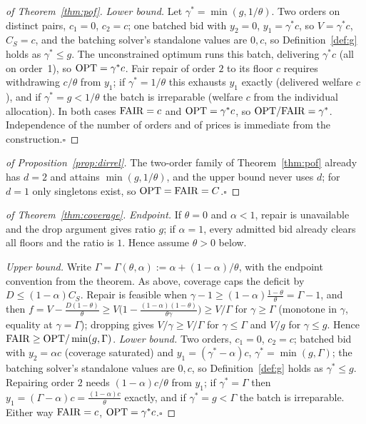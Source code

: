 \begin{proof}[of Theorem~\ref{thm:pof}]
\emph{Lower bound.} Let $\gamma^\ast=\min(g,1/\theta)$. Two orders on
distinct pairs, $c_1=0$, $c_2=c$; one batched bid with
$y_2=0$, $y_1=\gamma^\ast c$, so $V=\gamma^\ast c$, $C_S=c$, and the
batching solver's standalone values are $0,c$, so
Definition~\ref{def:g} holds as $\gamma^\ast\le g$. The unconstrained
optimum runs this batch, delivering $\gamma^\ast c$ (all on order~1), so
$\mathrm{OPT}=\gamma^\ast c$. Fair repair of order $2$ to its floor $c$ requires
withdrawing $c/\theta$ from $y_1$; if $\gamma^\ast=1/\theta$ this exhausts
$y_1$ exactly (delivered welfare $c$), and if
$\gamma^\ast=g<1/\theta$ the batch is irreparable (welfare $c$ from the
individual allocation). In both cases $\mathrm{FAIR}=c$ and
$\mathrm{OPT}=\gamma^\ast c$, so $\mathrm{OPT}/\mathrm{FAIR}=\gamma^\ast$. Independence of the
number of orders and of prices is immediate from the construction.\hfill$\square$
\end{proof}

\begin{proof}[of Proposition~\ref{prop:dirrel}]
The two-order family of Theorem~\ref{thm:pof} already has $d=2$ and
attains $\min(g,1/\theta)$, and the upper bound never uses $d$; for
$d=1$ only singletons exist, so $\mathrm{OPT}=\mathrm{FAIR}=C$.\hfill$\square$
\end{proof}

\begin{proof}[of Theorem~\ref{thm:coverage}]
\emph{Endpoint.} If $\theta=0$ and $\alpha<1$, repair is unavailable and
the drop argument gives ratio $g$; if $\alpha=1$, every admitted bid
already clears all floors and the ratio is $1$. Hence assume $\theta>0$
below.

\emph{Upper bound.} Write
$\Gamma=\Gamma(\theta,\alpha):=\alpha+(1-\alpha)/\theta$, with the
endpoint convention from the theorem. As above, coverage caps the deficit by
$D\le(1-\alpha)C_S$. Repair is feasible when
$\gamma-1\ge(1-\alpha)\frac{1-\theta}{\theta}=\Gamma-1$, and then
$f=V-\frac{D(1-\theta)}{\theta}\ge V\big(1-\frac{(1-\alpha)(1-\theta)}
{\theta\gamma}\big)\ge V/\Gamma$ for $\gamma\ge\Gamma$ (monotone in
$\gamma$, equality at $\gamma=\Gamma$); dropping gives $V/\gamma\ge
V/\Gamma$ for $\gamma\le\Gamma$ and $V/g$ for $\gamma\le g$. Hence
$\mathrm{FAIR}\ge\mathrm{OPT}/\min(g,\Gamma)$. \emph{Lower bound.} Two orders, $c_1=0$,
$c_2=c$; batched bid with $y_2=\alpha c$ (coverage saturated) and
$y_1=(\gamma^\ast-\alpha)c$, $\gamma^\ast=\min(g,\Gamma)$; the batching
solver's standalone values are $0,c$, so Definition~\ref{def:g} holds as
$\gamma^\ast\le g$. Repairing
order $2$ needs $(1-\alpha)c/\theta$ from $y_1$; if $\gamma^\ast=\Gamma$
then $y_1=(\Gamma-\alpha)c=\frac{(1-\alpha)c}{\theta}$ exactly, and if
$\gamma^\ast=g<\Gamma$ the batch is irreparable. Either way $\mathrm{FAIR}=c$,
$\mathrm{OPT}=\gamma^\ast c$.\hfill$\square$
\end{proof}

